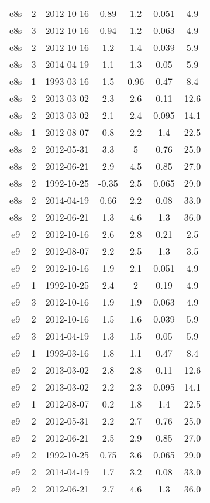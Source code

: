 \begin{table*}[htp]
\begin{tabular}{ccccccc}
e8s & 2 & 2012-10-16 & 0.89 & 1.2 & 0.051 & 4.9 \\
e8s & 3 & 2012-10-16 & 0.94 & 1.2 & 0.063 & 4.9 \\
e8s & 2 & 2012-10-16 & 1.2 & 1.4 & 0.039 & 5.9 \\
e8s & 3 & 2014-04-19 & 1.1 & 1.3 & 0.05 & 5.9 \\
e8s & 1 & 1993-03-16 & 1.5 & 0.96 & 0.47 & 8.4 \\
e8s & 2 & 2013-03-02 & 2.3 & 2.6 & 0.11 & 12.6 \\
e8s & 2 & 2013-03-02 & 2.1 & 2.4 & 0.095 & 14.1 \\
e8s & 1 & 2012-08-07 & 0.8 & 2.2 & 1.4 & 22.5 \\
e8s & 2 & 2012-05-31 & 3.3 & 5 & 0.76 & 25.0 \\
e8s & 2 & 2012-06-21 & 2.9 & 4.5 & 0.85 & 27.0 \\
e8s & 2 & 1992-10-25 & -0.35 & 2.5 & 0.065 & 29.0 \\
e8s & 2 & 2014-04-19 & 0.66 & 2.2 & 0.08 & 33.0 \\
e8s & 2 & 2012-06-21 & 1.3 & 4.6 & 1.3 & 36.0 \\
e9 & 2 & 2012-10-16 & 2.6 & 2.8 & 0.21 & 2.5 \\
e9 & 2 & 2012-08-07 & 2.2 & 2.5 & 1.3 & 3.5 \\
e9 & 2 & 2012-10-16 & 1.9 & 2.1 & 0.051 & 4.9 \\
e9 & 1 & 1992-10-25 & 2.4 & 2 & 0.19 & 4.9 \\
e9 & 3 & 2012-10-16 & 1.9 & 1.9 & 0.063 & 4.9 \\
e9 & 2 & 2012-10-16 & 1.5 & 1.6 & 0.039 & 5.9 \\
e9 & 3 & 2014-04-19 & 1.3 & 1.5 & 0.05 & 5.9 \\
e9 & 1 & 1993-03-16 & 1.8 & 1.1 & 0.47 & 8.4 \\
e9 & 2 & 2013-03-02 & 2.8 & 2.8 & 0.11 & 12.6 \\
e9 & 2 & 2013-03-02 & 2.2 & 2.3 & 0.095 & 14.1 \\
e9 & 1 & 2012-08-07 & 0.2 & 1.8 & 1.4 & 22.5 \\
e9 & 2 & 2012-05-31 & 2.2 & 2.7 & 0.76 & 25.0 \\
e9 & 2 & 2012-06-21 & 2.5 & 2.9 & 0.85 & 27.0 \\
e9 & 2 & 1992-10-25 & 0.75 & 3.6 & 0.065 & 29.0 \\
e9 & 2 & 2014-04-19 & 1.7 & 3.2 & 0.08 & 33.0 \\
e9 & 2 & 2012-06-21 & 2.7 & 4.6 & 1.3 & 36.0 \\
\hline
\end{tabular}

\end{table*}
